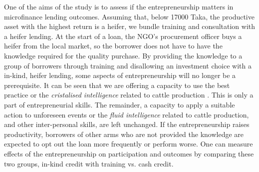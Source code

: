 	One of the aims of the study is to assess if the entrepreneurship matters in microfinance lending outcomes. Assuming that, below 17000 Taka, the productive asset with the highest return is a heifer, we bundle training and consultation with a heifer lending. At the start of a loan, the NGO's procurement officer buys a heifer from the local market, so the borrower does not have to have the knowledge required for the quality purchase. By providing the knowledge to a group of borrowers through training and disallowing an investment choice with a in-kind, heifer lending, some aspects of entrepreneurship will no longer be a prerequisite. It can be seen that we are offering a capacity to use the best practice or the \textit{cristalised intelligence} related to cattle production \citep{Cattell1963}. This is only a part of entrepreneurial skills. The remainder, a capacity to apply a suitable action to unforeseen events or the \textit{fluid intelligence} related to cattle production, and other inter-personal skills, are left unchanged. If the entrepreneurship raises productivity, borrowers of other arms who are not provided the knowledge are expected to opt out the loan more frequently or perform worse. One can measure effects of the entrepreneurship on participation and outcomes by comparing these two groups, in-kind credit with training vs. cash credit.
	
